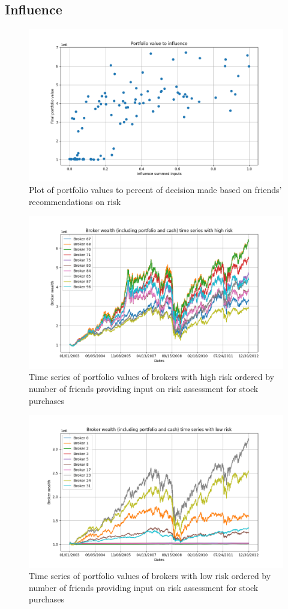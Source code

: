 \documentclass[letterpaper, 10 pt, proceedings]{ieeetran}
\begin{document}
	
	
	\subsection{Influence}
	
	\begin{figure}[h]
		\centering
		\includegraphics[width=.4\textwidth]{valueToInfluence_influence04.png}
		\caption{Plot of portfolio values to percent of decision made based on friends' recommendations on risk}
		\label{fig:value_to_influence_influencerun}
	\end{figure}	
	\FloatBarrier
	
	\begin{figure}[h]
		\centering
		\includegraphics[width=.4\textwidth]{timeSeriesJoint_influenceRun04_HighRisk.png}
		\caption{Time series of portfolio values of brokers with high risk ordered by number of friends providing input on risk assessment for stock purchases}
		\label{fig:high_risk_influence_time_series}
	\end{figure}	
	\FloatBarrier

	\begin{figure}[h]
		\centering
		\includegraphics[width=.4\textwidth]{timeSeriesJoint_influenceRun04_LowRisk.png}
		\caption{Time series of portfolio values of brokers with low risk ordered by number of friends providing input on risk assessment for stock purchases}
		\label{fig:low_risk_influence_time_series}
	\end{figure}	
	\FloatBarrier
\end{document}
